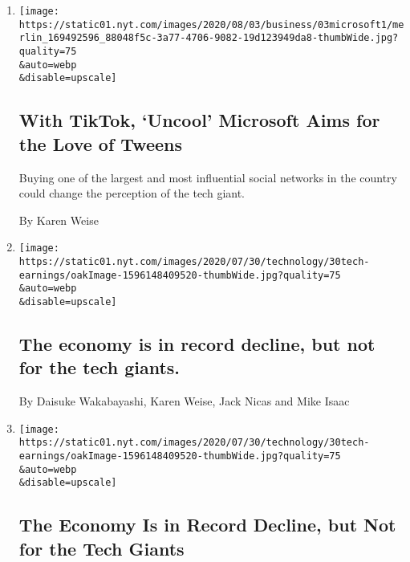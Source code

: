 \begin{enumerate}
\def\labelenumi{\arabic{enumi}.}
\item
  \href{/2020/08/03/technology/tiktok-microsoft-tweens.html}{}

  \texttt{[image: https://static01.nyt.com/images/2020/08/03/business/03microsoft1/merlin\_169492596\_88048f5c-3a77-4706-9082-19d123949da8-thumbWide.jpg?quality=75\\\&auto=webp\\\&disable=upscale]}

  \hypertarget{with-tiktok-uncool-microsoft-aims-for-the-love-of-tweens}{%
  \subsection{With TikTok, `Uncool' Microsoft Aims for the Love of
  Tweens}\label{with-tiktok-uncool-microsoft-aims-for-the-love-of-tweens}}

  Buying one of the largest and most influential social networks in the
  country could change the perception of the tech giant.

  By Karen Weise
\item
  \href{/live/2020/07/31/business/stock-market-today-coronavirus/the-economy-is-in-record-decline-but-not-for-the-tech-giants}{}

  \texttt{[image: https://static01.nyt.com/images/2020/07/30/technology/30tech-earnings/oakImage-1596148409520-thumbWide.jpg?quality=75\\\&auto=webp\\\&disable=upscale]}

  \hypertarget{the-economy-is-in-record-decline-but-not-for-the-tech-giants}{%
  \subsection{The economy is in record decline, but not for the tech
  giants.}\label{the-economy-is-in-record-decline-but-not-for-the-tech-giants}}

  By Daisuke Wakabayashi, Karen Weise, Jack Nicas and Mike Isaac
\item
  \href{/2020/07/30/technology/tech-company-earnings-amazon-apple-facebook-google.html}{}

  \texttt{[image: https://static01.nyt.com/images/2020/07/30/technology/30tech-earnings/oakImage-1596148409520-thumbWide.jpg?quality=75\\\&auto=webp\\\&disable=upscale]}

  \hypertarget{the-economy-is-in-record-decline-but-not-for-the-tech-giants-1}{%
  \subsection{The Economy Is in Record Decline, but Not for the Tech
  Giants}\label{the-economy-is-in-record-decline-but-not-for-the-tech-giants-1}}


\end{enumerate}
